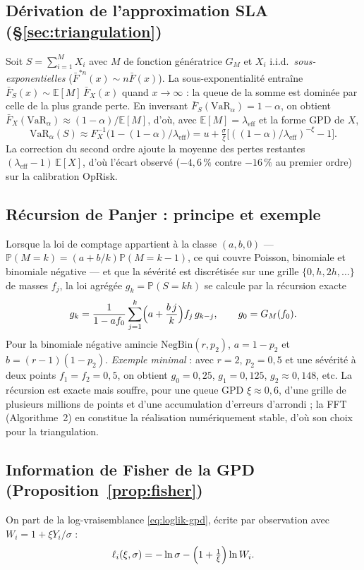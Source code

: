 \documentclass[11pt,a4paper]{article}
\theoremstyle{navystyle}
\theoremstyle{navydef}
\newcommand{\E}{\mathbb{E}}
\newcommand{\Prob}{\mathbb{P}}
\newcommand{\VaR}{\mathrm{VaR}}
\begin{document}
\subsection{Dérivation de l'approximation SLA (§\ref{sec:triangulation})}
\label{ann:sla}
Soit $S=\sum_{i=1}^M X_i$ avec $M$ de fonction génératrice $G_M$ et $X_i$ i.i.d.\ \emph{sous-exponentielles} ($\bar F^{*n}(x)\sim n\bar F(x)$). La sous-exponentialité entraîne $\bar F_S(x)\sim \E[M]\,\bar F_X(x)$ quand $x\to\infty$ : la queue de la somme est dominée par celle de la plus grande perte. En inversant $\bar F_S(\VaR_\alpha)=1-\alpha$, on obtient $\bar F_X(\VaR_\alpha)\approx(1-\alpha)/\E[M]$, d'où, avec $\E[M]=\lambda_{\text{eff}}$ et la forme GPD de $X$,
\begin{equation}
\VaR_\alpha(S)\approx F_X^{-1}\!\bigl(1-(1-\alpha)/\lambda_{\text{eff}}\bigr)=u+\tfrac{\sigma}{\xi}\bigl[((1-\alpha)/\lambda_{\text{eff}})^{-\xi}-1\bigr].
\end{equation}
La correction du second ordre \citep{bockersprittulla2006} ajoute la moyenne des pertes restantes $(\lambda_{\text{eff}}-1)\,\E[X]$, d'où l'écart observé ($-4{,}6\,\%$ contre $-16\,\%$ au premier ordre) sur la calibration OpRisk.

\subsection{Récursion de Panjer : principe et exemple}
\label{ann:panjer}
Lorsque la loi de comptage appartient à la classe $(a,b,0)$ --- $\Prob(M=k)=(a+b/k)\Prob(M=k-1)$, ce qui couvre Poisson, binomiale et binomiale négative --- et que la sévérité est discrétisée sur une grille $\{0,h,2h,\dots\}$ de masses $f_j$, la loi agrégée $g_k=\Prob(S=kh)$ se calcule par la récursion exacte
\begin{equation}
g_k=\frac{1}{1-a f_0}\sum_{j=1}^{k}\Bigl(a+\frac{b\,j}{k}\Bigr) f_j\, g_{k-j},\qquad g_0=G_M(f_0).
\end{equation}
Pour la binomiale négative amincie $\mathrm{NegBin}(r,p_2)$, $a=1-p_2$ et $b=(r-1)(1-p_2)$. \emph{Exemple minimal} : avec $r=2$, $p_2=0{,}5$ et une sévérité à deux points $f_1=f_2=0{,}5$, on obtient $g_0=0{,}25$, $g_1=0{,}125$, $g_2\approx0{,}148$, etc. La récursion est exacte mais souffre, pour une queue GPD $\xi\approx0{,}6$, d'une grille de plusieurs millions de points et d'une accumulation d'erreurs d'arrondi ; la FFT (Algorithme~2) en constitue la réalisation numériquement stable, d'où son choix pour la triangulation.

\subsection{Information de Fisher de la GPD (Proposition~\ref{prop:fisher})}
\label{ann:fisher}
On part de la log-vraisemblance \eqref{eq:loglik-gpd}, écrite par observation avec $W_i=1+\xi Y_i/\sigma$ :
\begin{equation}
\ell_i(\xi,\sigma)=-\ln\sigma-\Bigl(1+\tfrac1\xi\Bigr)\ln W_i.
\end{equation}
\end{document}
